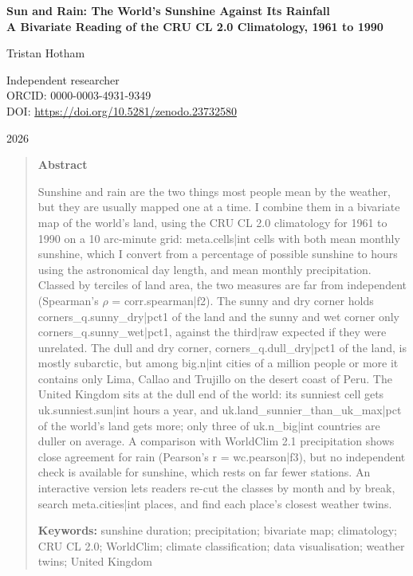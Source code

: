 \documentclass[11pt,a4paper]{article}
\begin{document}
\begin{center}
{\Large\bfseries Sun and Rain: The World's Sunshine Against Its Rainfall\\[2pt] A Bivariate Reading of the CRU CL 2.0 Climatology, 1961 to 1990\par}
\vspace{1.2em}
{\large Tristan Hotham\par}
\vspace{0.3em}
{\small Independent researcher\\
ORCID: 0000-0003-4931-9349\\
DOI: \href{https://doi.org/10.5281/zenodo.23732580}{https://doi.org/10.5281/zenodo.23732580}\par}
\vspace{0.8em}
2026
\end{center}

\begin{quote}
\small
\begin{center}\textbf{Abstract}\end{center}
Sunshine and rain are the two things most people mean by the weather, but they are usually mapped one at a time. I combine them in a bivariate map of the world's land, using the CRU CL 2.0 climatology for 1961 to 1990 on a 10 arc-minute grid: {{meta.cells|int}} cells with both mean monthly sunshine, which I convert from a percentage of possible sunshine to hours using the astronomical day length, and mean monthly precipitation. Classed by terciles of land area, the two measures are far from independent (Spearman's $\rho$ = {{corr.spearman|f2}}). The sunny and dry corner holds {{corners_q.sunny_dry|pct1}} of the land and the sunny and wet corner only {{corners_q.sunny_wet|pct1}}, against the {{third|raw}} expected if they were unrelated. The dull and dry corner, {{corners_q.dull_dry|pct1}} of the land, is mostly subarctic, but among {{big.n|int}} cities of a million people or more it contains only Lima, Callao and Trujillo on the desert coast of Peru. The United Kingdom sits at the dull end of the world: its sunniest cell gets {{uk.sunniest.sun|int}} hours a year, and {{uk.land_sunnier_than_uk_max|pct}} of the world's land gets more; only three of {{uk.n_big|int}} countries are duller on average. A comparison with WorldClim 2.1 precipitation shows close agreement for rain (Pearson's r = {{wc.pearson|f3}}), but no independent check is available for sunshine, which rests on far fewer stations. An interactive version lets readers re-cut the classes by month and by break, search {{meta.cities|int}} places, and find each place's closest weather twins.

\textbf{Keywords:} sunshine duration; precipitation; bivariate map; climatology; CRU CL 2.0; WorldClim; climate classification; data visualisation; weather twins; United Kingdom
\end{quote}
\end{document}
